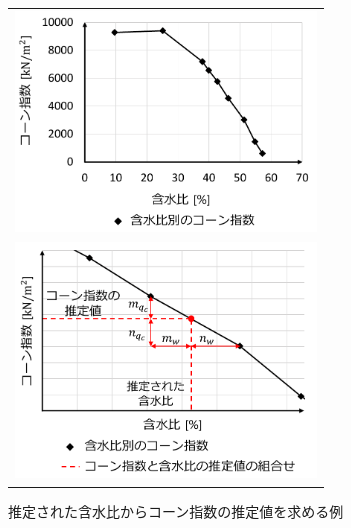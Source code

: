 \begin{figure}[b]
      \begin{center}
            \begin{tabular}{c}

                  \begin{minipage}[b]{\linewidth}
                  \centering
                  \hspace{-1cm}\includegraphics[width=8cm]{./Ch5_ConeIndexEstimation/Fig/coneindex_and_watercontent_relationship_compressed.pdf}
                  \caption{コーン指数と含水比の関係の例}
                  \label{fig:coneindex_and_watercontent_relationship}
                  \vspace{0.5cm}
                  \end{minipage}

                  \\

                  \begin{minipage}[b]{\linewidth}
                  \centering
                  \includegraphics[width=8cm]{./Ch5_ConeIndexEstimation/Fig/coneindex_estimation_method_compressed.pdf}
                  \caption{推定された含水比からコーン指数の推定値を求める例}
                  \label{fig:coneindex_estimation_method}
                  \end{minipage}

            \end{tabular}
      \end{center}
\end{figure}

